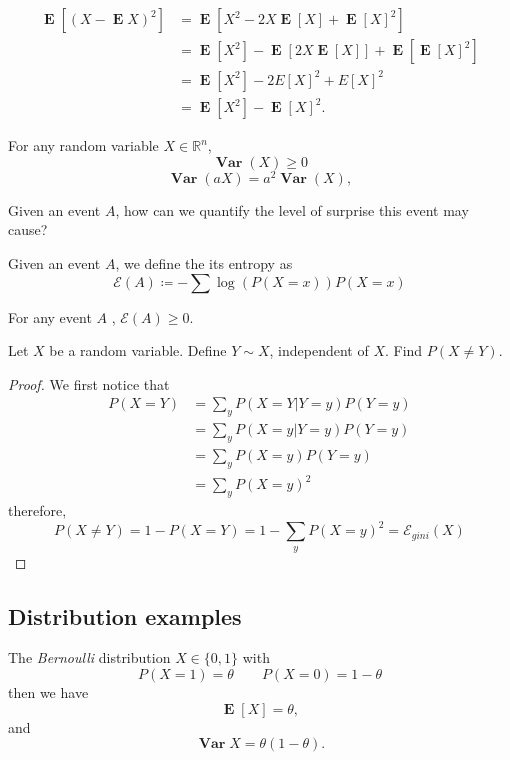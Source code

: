\documentclass{article}
\theoremstyle{problemstyle}
\newcommand{\R}{\mathbb R}
\DeclareMathOperator{\Var}{\mathbf{Var}}
\DeclareMathOperator{\E}{\mathbf{E}}
\begin{document}
\begin{remark}
  \begin{align*}
    \E[(X-\E X)^2] &= \E[X^2 - 2X\E[X] + \E[X]^2]\\
                   &= \E[X^2] - \E[2X\E[X]] + \E[\E[X]^2]\\
                   &= \E[X^2] - 2E[X]^2 + E[X]^2\\
                   &= \E[X^2] - \E[X]^2.
  \end{align*}
\end{remark}

\begin{theorem}
  For any random variable $ X\in \R^n $,
  \[
    \Var(X) \geq 0
  \]
 \[
   \Var(aX) = a^2 \Var(X),
 \] 
\end{theorem}

Given an event $ A $, how can we quantify the level of surprise this event may cause?

\begin{definition}[Entropy]
  Given an event $ A $, we define the its entropy as
  \[
    \mathcal E(A) \coloneqq-\sum \log(P(X=x)) P(X=x)
  \]
\end{definition}

\begin{theorem}
  For any event $ A $ ,
  $ \mathcal E(A) \geq 0 $.
\end{theorem}

\begin{problem}
  Let $ X $ be a random variable. Define $ Y\sim X $, independent of $ X $. Find $ P(X\neq Y) $.
\end{problem}
\begin{proof}
  We first notice that 
  \begin{align*}
    P(X=Y) &= \sum_y P(X=Y|Y=y)P(Y=y) \\
  &= \sum_y P(X=y|Y=y)P(Y=y) \\
  &= \sum_y P(X=y)P(Y=y) \\
  &= \sum_y P(X=y)^2
  \end{align*}
  \[
  \]
  therefore, 
  \[
    P(X\neq Y) = 1- P(X=Y) = 1-\sum_y P(X=y)^2 = \mathcal E_{gini}(X)
  \]
\end{proof}

\subsection{Distribution examples}

\begin{example}[Bernoulli]
The \textit{Bernoulli} distribution $ X\in \{0,1\} $ with
\[
  P(X=1) = \theta\qquad P(X=0) = 1-\theta
\]
then we have
\[
  \E[X] = \theta,
\]
and 
\[
  \Var X = \theta(1-\theta).
\]
\end{example}
\end{document}
